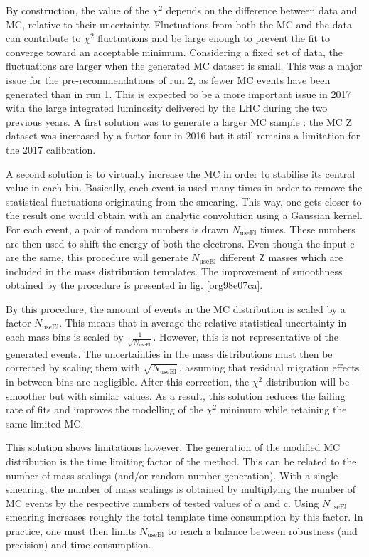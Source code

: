 By construction, the value of the $\chi^2$ depends on the difference between data and MC, relative to their uncertainty.
Fluctuations from both the MC and the data can contribute to $\chi^2$ fluctuations and be large enough to prevent the fit to converge toward an acceptable minimum.
Considering a fixed set of data, the fluctuations are larger when the generated MC dataset is small.
This was a major issue for the pre-recommendations of run 2, as fewer MC events have been generated than in run 1.
This is expected to be a more important issue in 2017 with the large integrated luminosity delivered by the LHC during the two previous years.
A first solution was to generate a larger MC sample : the MC Z dataset was increased by a factor four in 2016 but it still remains a limitation for the 2017 calibration.

A second solution is to virtually increase the MC in order to stabilise its central value in each bin.
Basically, each event is used many times in order to remove the statistical fluctuations originating from the smearing.
This way, one gets closer to the result one would obtain with an analytic convolution using a Gaussian kernel.
For each event, a pair of random numbers is drawn $N_\text{useEl}$ times.
These numbers are then used to shift the energy of both the electrons.
Even though the input c are the same, this procedure will generate $N_\text{useEl}$ different Z masses which are included in the mass distribution templates.
The improvement of smoothness obtained by the procedure is presented in fig. \ref{org98e07ca}.


By this procedure, the amount of events in the MC distribution is scaled by a factor $N_\text{useEl}$.
This means that in average the relative statistical uncertainty in each mass bins is scaled by $\frac{1}{\sqrt{N_\text{useEl}}}$.
However, this is not representative of the generated events.
The uncertainties in the mass distributions must then be corrected by scaling them with $\sqrt{N_\text{useEl}}$, assuming that residual migration effects in between bins are negligible.
After this correction, the $\chi^2$ distribution will be smoother but with similar values.
As a result, this solution reduces the failing rate of fits and improves the modelling of the $\chi^2$ minimum while retaining the same limited MC.

This solution shows limitations however.
The generation of the modified MC distribution is the time limiting factor of the method.
This can be related to the number of mass scalings (and/or random number generation).
With a single smearing, the number of mass scalings is obtained by multiplying the number of MC events by the respective numbers of tested values of $\alpha$ and c.
Using $N_\text{useEl}$ smearing increases roughly the total template time consumption by this factor.
In practice, one must then limits $N_\text{useEl}$ to reach a balance between robustness (and precision) and time consumption.


